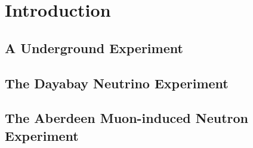 
\chapter{Introduction}

\section{A Underground Experiment}

\section{The Dayabay Neutrino Experiment}

\section{The Aberdeen Muon-induced Neutron Experiment}
